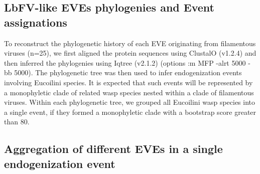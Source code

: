 \subsection{LbFV-like EVEs phylogenies and Event assignations}

To reconstruct the phylogenetic history of each EVE originating from filamentous viruses (n=25), we first aligned the protein sequences using ClustalO  (v1.2.4)\citep{sievers_fast_2011} and then inferred the phylogenies using Iqtree (v2.1.2) \citep{minh_corrigendum_2020} (options :m MFP -alrt 5000 -bb 5000). The phylogenetic tree was then used to infer endogenization events involving Eucoilini species. It is expected that such events will be represented by a monophyletic clade of related wasp species nested within a clade of filamentous viruses. Within each phylogenetic tree, we grouped all Eucoilini wasp species into a single event, if they formed a monophyletic clade with a bootstrap score greater than 80. 

\subsection{Aggregation of different EVEs in a single endogenization event}

